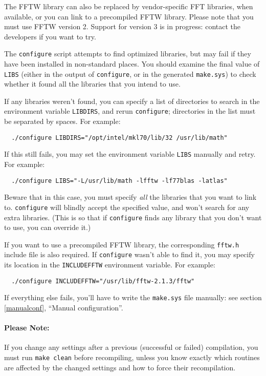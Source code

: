 \documentclass[12pt,a4paper]{article}
\begin{document}
The FFTW library can also be replaced by vendor-specific FFT
libraries, when available, or you can link to a precompiled FFTW
library.  Please note that you must use FFTW version 2.  Support for
version 3 is in progress: contact the developers if you want to try.

The \texttt{configure} script attempts to find optimized libraries,
but may fail if they have been installed in non-standard places.
You should examine the final value of \texttt{LIBS} (either in the
output of \texttt{configure}, or in the generated \texttt{make.sys})
to check whether it found all the libraries that you intend to use.

If any libraries weren't found, you can specify a list of directories
to search in the environment variable \texttt{LIBDIRS}, and rerun
\texttt{configure}; directories in the list must be separated by
spaces.  For example:
\begin{verbatim}
  ./configure LIBDIRS="/opt/intel/mkl70/lib/32 /usr/lib/math"
\end{verbatim}
If this still fails, you may set the environment variable
\texttt{LIBS} manually and retry.  For example:
\begin{verbatim}
  ./configure LIBS="-L/usr/lib/math -lfftw -lf77blas -latlas"
\end{verbatim}
Beware that in this case, you must specify \emph{all} the libraries
that you want to link to.  \texttt{configure} will blindly accept the
specified value, and won't search for any extra libraries.  (This is
so that if \texttt{configure} finds any library that you don't want to
use, you can override it.)

If you want to use a precompiled FFTW library, the corresponding
\texttt{fftw.h} include file is also required.
If \texttt{configure} wasn't able to find it, you may specify its
location in the \texttt{INCLUDEFFTW} environment variable.
For example:
\begin{verbatim}
  ./configure INCLUDEFFTW="/usr/lib/fftw-2.1.3/fftw"
\end{verbatim}
If everything else fails, you'll have to write the \texttt{make.sys}
file manually: see section \ref{manualconf}, ``Manual configuration''.

\paragraph{Please Note:}

If you change any settings after a previous (successful or failed)
compilation, you must run \texttt{make clean} before recompiling,
unless you know exactly which routines are affected by the changed
settings and how to force their recompilation.
\end{document}
